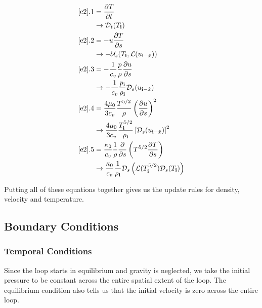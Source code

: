 \documentclass[iop]{emulateapj}
\begin{document}
					\begin{align}
						\ref{e2}.1 &= \frac{\partial T}{\partial t} \nonumber \\ &\rightarrow \mathcal{D}_t(T_{\mathbf{i}}) \\
						\ref{e2}.2 &= -u \frac{\partial T}{\partial s} \nonumber \\ &\rightarrow - \mathcal{U}_s(T_{\mathbf{i}}, \mathcal{L}(u_{\mathbf{i} - \hat{x}})) \\
						\ref{e2}.3 &= - \frac{1}{c_v} \frac{p}{\rho} \frac{\partial u}{\partial s} \nonumber \\ &\rightarrow - \frac{1}{c_v} \frac{p_{\mathbf{i}}}{\rho_{\mathbf{i}}} \mathcal{D}_s(u_{\mathbf{i} - \hat{x}}) \\
						\ref{e2}.4 &= \frac{4 \mu_0}{3 c_v} \frac{T^{5/2}}{\rho} \left(\frac{\partial u}{\partial s}\right)^2 \nonumber \\ &\rightarrow \frac{4 \mu_0}{3 c_v} \frac{T_{\mathbf{i}}^{5/2}}{\rho_{\mathbf{i}}} \left[ \mathcal{D}_s(u_{\mathbf{i} - \hat{x}}) \right]^2 \\
						\ref{e2}.5 &= \frac{\kappa_0}{c_v} \frac{1}{\rho} \frac{\partial}{\partial s} \left( T^{5/2} \frac{\partial T}{\partial s} \right) \nonumber \\ &\rightarrow \frac{\kappa_0}{c_v} \frac{1}{\rho_{\mathbf{i}}} \mathcal{D}_s \left( \mathcal{L}(T_{\mathbf{i}}^{5/2}) \mathcal{D}_s(T_{\mathbf{i}}) \right)
					\end{align}
					
					Putting all of these equations together gives us the update rules for density, velocity and temperature.
		\subsection{Boundary Conditions} \label{bc}
			\subsubsection{Temporal Conditions}	\label{time_bc}
				Since the loop starts in equilibrium and gravity is neglected, we take the initial pressure to be constant across the entire spatial extent of the loop. The equilibrium condition also tells us that the initial velocity is zero across the entire loop.
				
\end{document}
